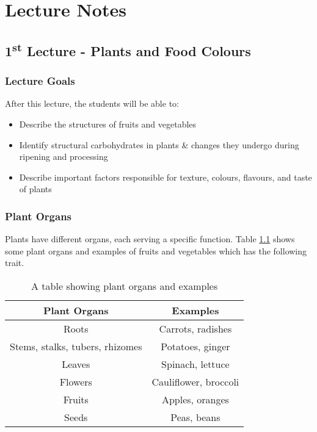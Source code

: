 \chapter{Lecture Notes}
\setlength{\headheight}{12.71342pt}
\addtolength{\topmargin}{-0.71342pt}

\section*{1\texorpdfstring{\textsuperscript{st}}{st} Lecture - Plants and Food Colours}
\subsection*{Lecture Goals}
After this lecture, the students will be able to:
\begin{highlight}
    \begin{itemize}
    \item Describe the structures of fruits and vegetables
    
    \item Identify structural carbohydrates in plants \& changes they undergo during ripening and processing
    
    \item Describe important factors responsible for texture, colours, flavours, and taste of plants
    \end{itemize}
\end{highlight}

\subsection*{Plant Organs}
Plants have different organs, each serving a specific function. Table \ref{tab:L01_plant_organs} shows some plant organs and examples of fruits and vegetables which has the following trait.
\begin{table}[h]
    \centering
    \caption{A table showing plant organs and examples}
    \label{tab:L01_plant_organs}
    \begin{tabular}{c|c}
    \textbf{Plant Organs} & \textbf{Examples} \\
    \hline
    Roots & Carrots, radishes \\

    Stems, stalks, tubers, rhizomes & Potatoes, ginger \\

    Leaves & Spinach, lettuce \\

    Flowers & Cauliflower, broccoli \\

    Fruits & Apples, oranges \\

    Seeds & Peas, beans \\
    \end{tabular}
\end{table}



